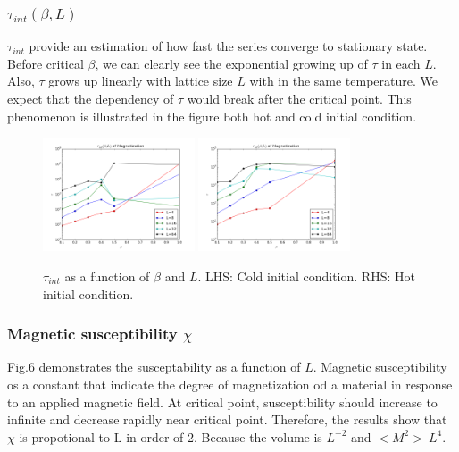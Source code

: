\documentclass[12pt]{article}
\begin{document}
\subsubsection{$\tau_{int}(\beta,L)$}
$\tau_{int}$ provide an estimation of how fast the series converge to stationary state. Before critical $\beta$, we can clearly see the exponential growing up of $\tau$ in each $L$. Also, $\tau$ grows up linearly with lattice size $L$ with in the same temperature. We expect that the dependency of $\tau$ would break after the critical point. This phenomenon is illustrated in the figure both hot and cold initial condition. 

\begin{figure}[h!]
	\begin{center}
		\includegraphics[width=0.4\textwidth]{Cold_Mag_sq.png}
		\includegraphics[width=0.4\textwidth]{Hot_Mag_sq.png}
		\caption{$\tau_{int}$ as a function of $\beta$ and $L$. LHS: Cold initial condition. RHS: Hot initial condition.}
		\label{fig5}
	\end{center}
\end{figure}



\subsubsection{Magnetic susceptibility $\chi$}
Fig.6 demonstrates the susceptability as a function of $L$. Magnetic susceptibility os a constant that indicate the degree of magnetization od a material in response to an applied magnetic field. At critical point, susceptibility should increase to infinite and decrease rapidly near critical point. 
Therefore, the results show that $\chi$ is propotional to L in order of 2. Because the volume is $L^{-2}$ and $<M^2> ~ L^4$.
\end{document}
